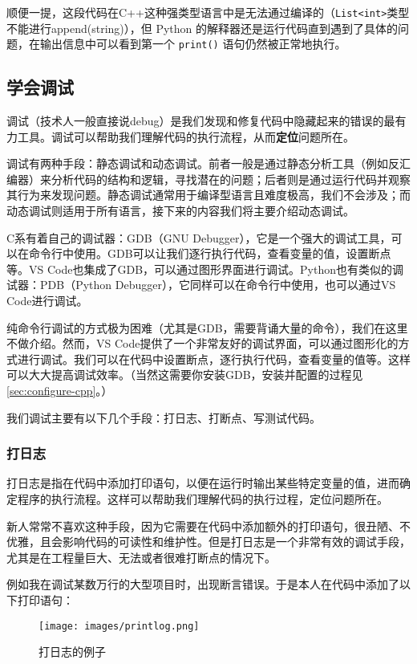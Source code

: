 \documentclass[../main.tex]{subfiles}
\begin{document}
顺便一提，这段代码在C++这种强类型语言中是无法通过编译的（\texttt{List<int>}类型不能进行append(string)），但 Python 的解释器还是运行代码直到遇到了具体的问题，在输出信息中可以看到第一个 \texttt{print()} 语句仍然被正常地执行。

\subsection{学会调试}\label{subsec:debugging}

调试（技术人一般直接说debug）是我们发现和修复代码中隐藏起来的错误的最有力工具。调试可以帮助我们理解代码的执行流程，从而\textbf{定位}问题所在。

调试有两种手段：静态调试和动态调试。前者一般是通过静态分析工具（例如反汇编器）来分析代码的结构和逻辑，寻找潜在的问题；后者则是通过运行代码并观察其行为来发现问题。静态调试通常用于编译型语言且难度极高，我们不会涉及；而动态调试则适用于所有语言，接下来的内容我们将主要介绍动态调试。

C系有着自己的调试器：GDB（GNU Debugger），它是一个强大的调试工具，可以在命令行中使用。GDB可以让我们逐行执行代码，查看变量的值，设置断点等。VS Code也集成了GDB，可以通过图形界面进行调试。Python也有类似的调试器：PDB（Python Debugger），它同样可以在命令行中使用，也可以通过VS Code进行调试。

纯命令行调试的方式极为困难（尤其是GDB，需要背诵大量的命令），我们在这里不做介绍。然而，VS Code提供了一个非常友好的调试界面，可以通过图形化的方式进行调试。我们可以在代码中设置断点，逐行执行代码，查看变量的值等。这样可以大大提高调试效率。（当然这需要你安装GDB，安装并配置的过程见\ref{sec:configure-cpp}。）

我们调试主要有以下几个手段：打日志、打断点、写测试代码。

\subsubsection{打日志}

打日志是指在代码中添加打印语句，以便在运行时输出某些特定变量的值，进而确定程序的执行流程。这样可以帮助我们理解代码的执行过程，定位问题所在。

新人常常不喜欢这种手段，因为它需要在代码中添加额外的打印语句，很丑陋、不优雅，且会影响代码的可读性和维护性。但是打日志是一个非常有效的调试手段，尤其是在工程量巨大、无法或者很难打断点的情况下。

例如我在调试某数万行的大型项目时，出现断言错误。于是本人在代码中添加了以下打印语句：

\begin{figure}[htbp]
\centering
\texttt{[image: images/printlog.png]}
\caption{打日志的例子}
\end{figure}
\end{document}
